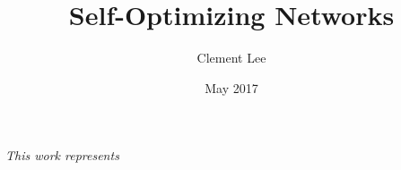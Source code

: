 \documentclass[12pt]{report}
\title{Self-Optimizing Networks}
\author{Clement Lee}
\date{May 2017}
\begin{document}
%

\tableofcontents

% 















\nocite{*}



\begin{center}
\emph{This work represents }
\end{center}
\end{document}

